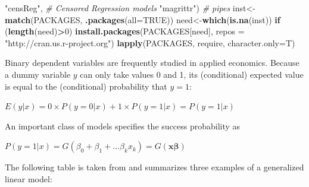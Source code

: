 \documentclass[]{book}
\newenvironment{Shaded}{\begin{snugshade}}{\end{snugshade}}
\newcommand{\CommentTok}[1]{\textcolor[rgb]{0.56,0.35,0.01}{\textit{#1}}}
\newcommand{\ControlFlowTok}[1]{\textcolor[rgb]{0.13,0.29,0.53}{\textbf{#1}}}
\newcommand{\DataTypeTok}[1]{\textcolor[rgb]{0.13,0.29,0.53}{#1}}
\newcommand{\DecValTok}[1]{\textcolor[rgb]{0.00,0.00,0.81}{#1}}
\newcommand{\KeywordTok}[1]{\textcolor[rgb]{0.13,0.29,0.53}{\textbf{#1}}}
\newcommand{\NormalTok}[1]{#1}
\newcommand{\OperatorTok}[1]{\textcolor[rgb]{0.81,0.36,0.00}{\textbf{#1}}}
\newcommand{\OtherTok}[1]{\textcolor[rgb]{0.56,0.35,0.01}{#1}}
\newcommand{\StringTok}[1]{\textcolor[rgb]{0.31,0.60,0.02}{#1}}
\begin{document}
\begin{Shaded}
\begin{Highlighting}[]
            \StringTok{"censReg"}\NormalTok{, }\CommentTok{# Censored Regression models}
            \StringTok{"magrittr"}\NormalTok{) }\CommentTok{#  pipes}
\NormalTok{inst<-}\KeywordTok{match}\NormalTok{(PACKAGES, }\KeywordTok{.packages}\NormalTok{(}\DataTypeTok{all=}\OtherTok{TRUE}\NormalTok{))}
\NormalTok{need<-}\KeywordTok{which}\NormalTok{(}\KeywordTok{is.na}\NormalTok{(inst))}
\ControlFlowTok{if}\NormalTok{ (}\KeywordTok{length}\NormalTok{(need)}\OperatorTok{>}\DecValTok{0}\NormalTok{) }\KeywordTok{install.packages}\NormalTok{(PACKAGES[need], }\DataTypeTok{repos =} \StringTok{"http://cran.us.r-project.org"}\NormalTok{)}
\KeywordTok{lapply}\NormalTok{(PACKAGES, require, }\DataTypeTok{character.only=}\NormalTok{T)}
\end{Highlighting}
\end{Shaded}

Binary dependent variables are frequently studied in applied economics. Because a dummy variable \(y\) can only take values 0 and 1, its (conditional) expected value is equal to the (conditional) probability that \(y=1\):

\(E(y|x) = 0 \times P(y = 0|x) + 1 \times P(y = 1|x) = P(y=1|x)\)

An important class of models specifies the success probability as

\(P(y = 1 | x) = G(\beta_0 + \beta_1 + \dots \beta_k x_k) = G(\boldsymbol{x} \boldsymbol{\beta})\)

The following table is taken from \citet{dalpiaz2016} and summarizes three examples of a generalized linear model:
\end{document}
